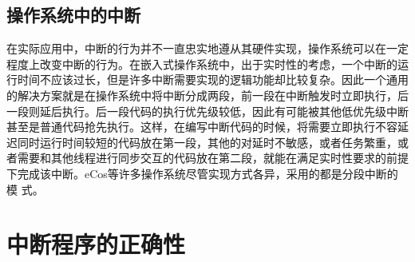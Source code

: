 \subsection{操作系统中的中断}
在实际应用中，中断的行为并不一直忠实地遵从其硬件实现，操作系统可以在一定
程度上改变中断的行为。在嵌入式操作系统中，出于实时性的考虑，一个中断的运
行时间不应该过长，但是许多中断需要实现的逻辑功能却比较复杂。因此一个通用
的解决方案就是在操作系统中将中断分成两段，前一段在中断触发时立即执行，后
一段则延后执行。后一段代码的执行优先级较低，因此有可能被其他低优先级中断
甚至是普通代码抢先执行。这样，在编写中断代码的时候，将需要立即执行不容延
迟同时运行时间较短的代码放在第一段，其他的对延时不敏感，或者任务繁重，或
者需要和其他线程进行同步交互的代码放在第二段，就能在满足实时性要求的前提
下完成该中断。eCos等许多操作系统尽管实现方式各异，采用的都是分段中断的模
式。\cite{ecos}

\section{中断程序的正确性}

